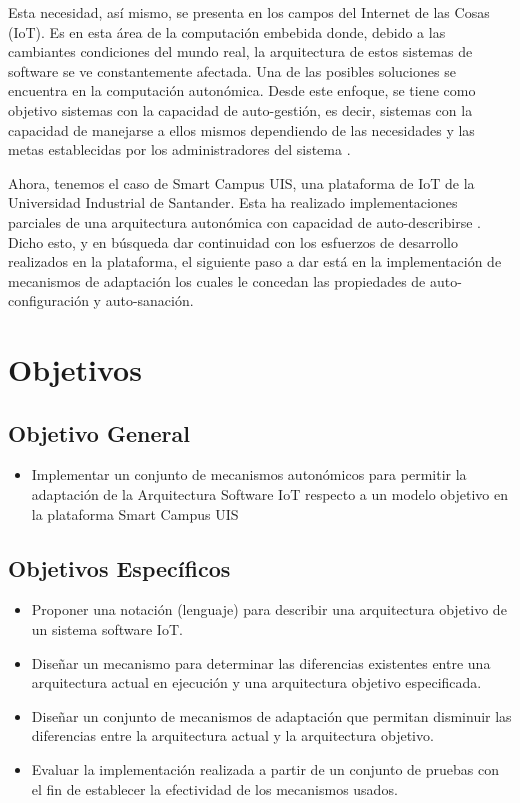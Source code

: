 \documentclass[12pt]{article}
\begin{document}
    Esta necesidad, así mismo, se presenta en los campos del Internet de las Cosas (IoT). Es en esta área de la computación embebida donde, debido a las cambiantes condiciones del mundo real, la arquitectura de estos sistemas de software se ve constantemente afectada. Una de las posibles soluciones se encuentra en la computación autonómica. Desde este enfoque, se tiene como objetivo sistemas con la capacidad de auto-gestión, es decir, sistemas con la capacidad de manejarse a ellos mismos dependiendo de las necesidades y las metas establecidas por los administradores del sistema \cite{evaluation_2004}.
    
    Ahora, tenemos el caso de Smart Campus UIS, una plataforma de IoT de la Universidad Industrial de Santander. Esta ha realizado implementaciones parciales de una arquitectura autonómica con capacidad de auto-describirse \cite{henry_2020}. Dicho esto, y en búsqueda dar continuidad con los esfuerzos de desarrollo realizados en la plataforma, el siguiente paso a dar está en la implementación de mecanismos de adaptación los cuales le concedan las propiedades de auto-configuración y auto-sanación.

    \section{Objetivos}
    \subsection{Objetivo General}
    \begin{itemize}

        \item Implementar un conjunto de mecanismos autonómicos para permitir la adaptación de la Arquitectura Software IoT respecto a un modelo objetivo en la plataforma Smart Campus UIS

    \end{itemize}

    \subsection{Objetivos Específicos}

    \begin{itemize}
        \item Proponer una notación (lenguaje) para describir una arquitectura objetivo de un sistema software IoT.
        \item Diseñar un mecanismo para determinar las diferencias existentes entre una arquitectura actual en ejecución y una arquitectura objetivo especificada.
        \item Diseñar un conjunto de mecanismos de adaptación que permitan disminuir las diferencias entre la arquitectura actual y la arquitectura objetivo.
        \item Evaluar la implementación realizada a partir de un conjunto de pruebas con el fin de establecer la efectividad de los mecanismos usados.

    \end{itemize}
\end{document}
